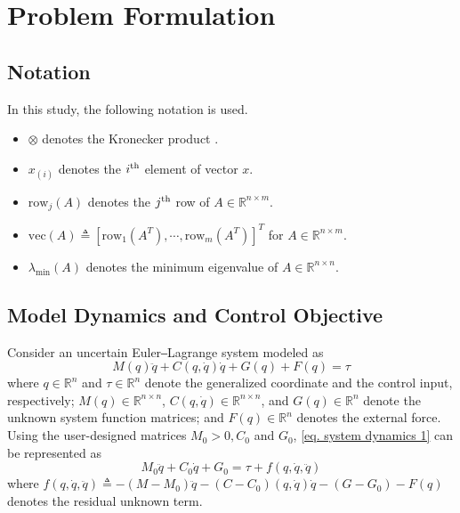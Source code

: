 \documentclass[letterpaper, 10 pt, conference]{ieeeconf}  %
\begin{document}
\section{Problem Formulation}\label{sec: Problem Formulation}

\subsection{Notation}
In this study, the following notation is used.

\begin{itemize}
    \item $\otimes$ denotes the Kronecker product \cite{RN22}.
    \item $x_{(i)}$ denotes the $i\textsuperscript{th}$ element of vector $x$.    
    \item $\text{row}_j(A)$ denotes the $j\textsuperscript{th}$ row of $A\in\mathbb{R}^{n\times m}$. 
    \item $\text{vec}(A)\triangleq [\text{row}_1(A^T)  ,\cdots,\text{row}_m(A^T)  ]^T   $ for $A\in\mathbb{R}^{n\times m}$.
    \item $\lambda_\text{min}(A)$ denotes the minimum eigenvalue of $A\in\mathbb{R}^{n\times n}$.
\end{itemize}

\subsection{Model Dynamics and Control Objective}

Consider an uncertain Euler‒Lagrange system modeled as
\begin{equation}
    M(q)\ddot q + C(q,\dot q)\dot q + G(q) + F(q) = \tau
    \label{eq. system dynamics 1}
\end{equation}
where $q\in \mathbb{R}^n$ and $\tau\in\mathbb R^n$ denote the generalized coordinate and the control input, respectively; $M(q)\in\mathbb{R}^{n\times n}$, $C(q,\dot q)\in\mathbb{R}^{n\times n}$, and $G(q)\in\mathbb{R}^{n}$ denote the unknown system function matrices; and $F(q)\in\mathbb{R}^{n}$ denotes the external force.
Using the user-designed matrices $M_0>0,C_0$ and $G_0$, \eqref{eq. system dynamics 1} can be represented as 
\begin{equation}
    M_0\ddot q+C_0\dot q+G_0 = \tau + f(q,\dot q,\ddot q)
    \label{eq. system dynamics 2}
\end{equation}
where $f(q,\dot q,\ddot q) \triangleq -(M-M_0)\ddot q-(C-C_0)(q,\dot q)\dot q -(G-G_0) -F(q)$ denotes the residual unknown term.
\end{document}

